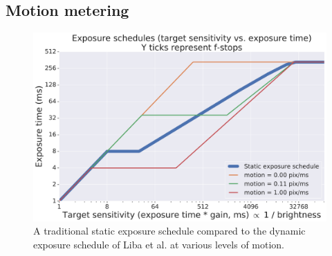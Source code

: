 \documentclass{sig-alternate}
\begin{document}


\subsection{Motion metering}
\label{sec:motionMetering}

\begin{figure}
\centering
\includegraphics[width=\columnwidth]{figures/liba2019-figure-7.pdf}
\caption{A traditional static exposure schedule compared to the dynamic exposure schedule of Liba et al. at various levels of motion.~\cite{Liba2019}}
\label{fig:exposure}


\end{figure}
\end{document}
